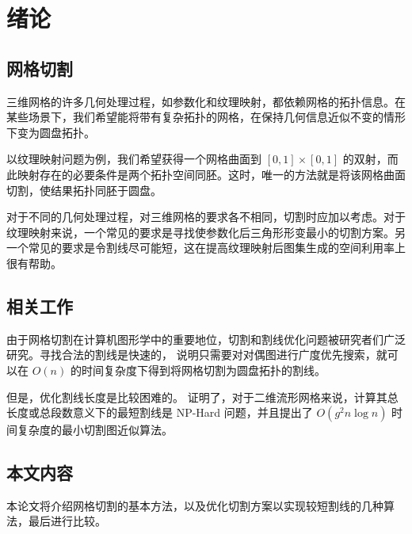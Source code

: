 
\chapter{绪论}

\section{网格切割}

三维网格的许多几何处理过程，如参数化和纹理映射，都依赖网格的拓扑信息。在某些场景下，我们希望能将带有复杂拓扑的网格，在保持几何信息近似不变的情形下变为圆盘拓扑。

以纹理映射问题为例，我们希望获得一个网格曲面到 $ [0, 1] \times [0, 1] $ 的双射，而此映射存在的必要条件是两个拓扑空间同胚。这时，唯一的方法就是将该网格曲面切割，使结果拓扑同胚于圆盘。

对于不同的几何处理过程，对三维网格的要求各不相同，切割时应加以考虑。对于纹理映射来说，一个常见的要求是寻找使参数化后三角形形变最小的切割方案\cite{Gu2002}。另一个常见的要求是令割线尽可能短，这在提高纹理映射后图集生成的空间利用率上很有帮助\cite{atlasgen}。

\section{相关工作}

由于网格切割在计算机图形学中的重要地位，切割和割线优化问题被研究者们广泛研究。寻找合法的割线是快速的，\citet{Dey1995} 说明只需要对对偶图进行广度优先搜索，就可以在 $ O(n) $ 的时间复杂度下得到将网格切割为圆盘拓扑的割线。

但是，优化割线长度是比较困难的。\citet{Erickson2002} 证明了，对于二维流形网格来说，计算其总长度或总段数意义下的最短割线是 NP-Hard 问题，并且提出了 $ O(g^2 n \log n) $ 时间复杂度的最小切割图近似算法。

\section{本文内容}

本论文将介绍网格切割的基本方法，以及优化切割方案以实现较短割线的几种算法，最后进行比较。



